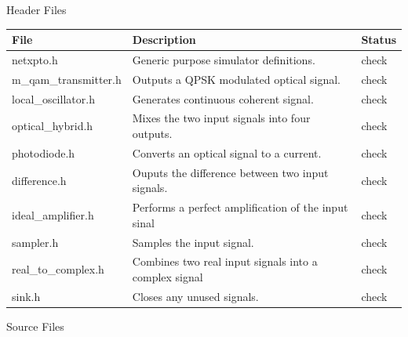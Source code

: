 Header Files
\begin{table}[H]
\centering
\begin{tabulary}{1.0\textwidth}{|L|L|l|}
\hline
\textbf{File}           & \textbf{Description}									& {\bf Status}\\
\hline
netxpto.h               & Generic purpose simulator definitions.				& check\\
\hline
m\_qam\_transmitter.h   & Outputs a QPSK modulated optical signal.				& check\\
\hline
local\_oscillator.h     & Generates continuous coherent signal.					& check\\
\hline
optical\_hybrid.h       & Mixes the two input signals into four outputs.		& check\\
\hline
photodiode.h            & Converts an optical signal to a current.				& check\\
\hline
difference.h            & Ouputs the difference between two input signals.		& check\\
\hline
ideal\_amplifier.h		& Performs a perfect amplification of the input sinal	& check\\
\hline
sampler.h               & Samples the input signal.								& check\\
\hline
real\_to\_complex.h		& Combines two real input signals into a complex signal	& check\\
\hline
sink.h                  & Closes any unused signals.							& check\\
\hline
\end{tabulary}
\end{table}
%
%
Source Files

